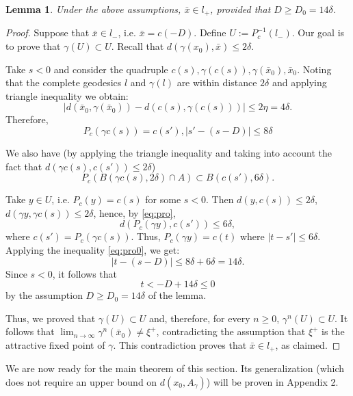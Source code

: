 \documentclass[12pt]{amsbook}%
\newtheorem{lem}[thm]{Lemma}
\theoremstyle{definition}
\theoremstyle{remark}
\numberwithin{section}{chapter}
\numberwithin{subsection}{section}
\numberwithin{figure}{chapter}
\def\ga{\gamma}
\begin{document}
 \begin{lem}\label{lem:right move}
Under the above assumptions, $\bar{x}\in l_+$, provided that $D\geqslant D_0=14\delta$.  
\end{lem}
\begin{proof} %

Suppose that $\bar{x}\in l_-$, i.e. $\bar{x}=c(-D)$. Define $U:= P_c^{-1}(l_-)$. 
Our goal is to prove that $\ga(U)\subset U$. Recall that $d(\gamma(x_0), \bar{x})\leqslant 2\delta$. 

Take $s<0$ and consider the quadruple $c(s), \ga(c(s)), \ga(\bar{x}_0), \bar{x}_0$. Noting that the complete geodesics $l$ and $\gamma(l)$ are within distance $2\delta$ and applying triangle inequality we obtain: 
$$
|d(\bar{x}_0, \ga(\bar{x}_0))  - d(c(s), \ga(c(s)))|\leqslant 2\eta=4\delta. 
$$
Therefore, 
\begin{equation}\label{eq:pro0}
P_c\left( \gamma c(s)\right)= c(s'),  |s'- (s-D)|\leqslant 8\delta
\end{equation}

We also have (by applying the triangle inequality and taking into account the fact that 
$d(\gamma c(s), c(s'))\leqslant 2\delta$) 
\begin{equation}\label{eq:pro}
P_c( B( \gamma c(s), 2\delta)\cap A)\subset B( c(s'), 6\delta).  
\end{equation}

Take $y\in U$, i.e. $P_c(y)=c(s)$ for some $s<0$. Then $d(y, c(s))\leqslant 2\delta$, 
$d(\ga y, \ga c(s))\leqslant 2\delta$, hence, by \eqref{eq:pro}, 
$$
d(P_c(\ga y), c(s'))\leqslant 6\delta,
$$
where $c(s')=P_c( \ga c(s))$. Thus, $P_c(\ga y)=c(t)$ where $|t-s'|\leqslant 6\delta$. Applying 
the inequality \eqref{eq:pro0}, we get:
$$
|t- (s-D)|\leqslant 8\delta + 6\delta=14\delta. 
$$
Since $s<0$, it follows that 
$$
t< - D + 14\delta\leqslant 0 
$$
by the assumption $D\geqslant D_0=14\delta$ of the lemma. 
 
Thus, we proved that  $\ga(U)\subset U$ and, therefore, for every $n\geqslant 0$, 
$\ga^n(U)\subset U$. It follows that $\lim_{n\to\infty} \ga^n(\bar{x}_0)\ne \xi^+$,  
contradicting the assumption that $\xi^+$ is the attractive fixed point of $\ga$.  This contradiction proves that $\bar{x}\in l_+$, as claimed. 
\end{proof} 

We are now ready for the main theorem of this section. Its generalization (which does not require an upper bound on $d(x_0, A_\ga)$)  
will be proven in Appendix 2. 
\end{document}
